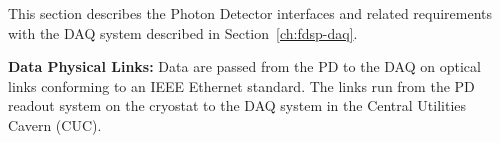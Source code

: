 






This section describes the Photon Detector interfaces and related requirements with the DAQ system described in Section~\ref{ch:fdsp-daq}.

\hspace{0.5cm}\textbf{Data Physical Links: }Data are passed from the PD to the DAQ on optical links conforming to an IEEE Ethernet standard. The links run from the PD readout system on the cryostat to the DAQ system in the Central Utilities Cavern (CUC).


